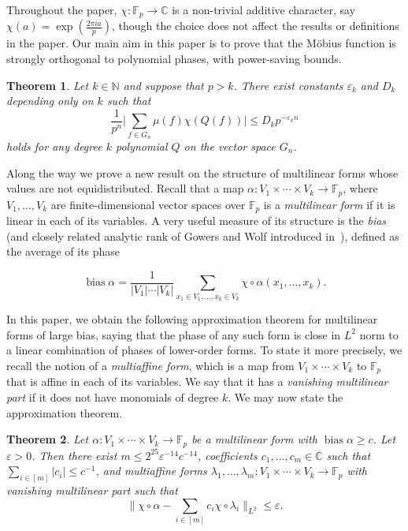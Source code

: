 \documentclass[a4paper,11pt]{article}
\newtheorem{theorem}{Theorem}
\theoremstyle{definition}
\newcommand{\on}[1]{
	\operatorname{#1}
}
\newcommand{\tdt}{\times\cdots\times}
\begin{document}
Throughout the paper, $\chi : \mathbb{F}_p \to \mathbb{C}$ is a non-trivial additive character, say $\chi(a) = \exp(\frac{2 \pi i a}{p})$, though the choice does not affect the results or definitions in the paper. Our main aim in this paper is to prove that the M\"obius function is strongly orthogonal to polynomial phases, with power-saving bounds.

\begin{theorem}\label{main_thm}
    Let $k \in \mathbb{N}$ and suppose that $p > k$. There exist
 constants $\varepsilon_k$ and $D_k$ depending only on $k$ such that 
    \[
    \frac{1}{p^n}\Big|\sum_{f \in G_n} \mu(f)\chi(Q(f))\Big| \leq  D_k p^{-\varepsilon_k n}
    \]
    holds for any degree $k$ polynomial $Q$ on the vector space $G_n$.
\end{theorem}

Along the way we prove a new result on the structure of multilinear forms whose values are not equidistributed. Recall that a map $\alpha : V_1 \tdt V_k \to \mathbb{F}_p$, where $V_1, \dots, V_k$ are finite-dimensional vector spaces over $\mathbb{F}_p$ is a \textit{multilinear form} if it is linear in each of its variables. A very useful measure of its structure is the \textit{bias} (and closely related analytic rank of Gowers and Wolf introduced in~\cite{GowWolf}), defined as the average of its phase 

\[\on{bias}\alpha = \frac{1}{|V_1|\cdots |V_k|} \sum_{x_1 \in V_1, \dots, x_k \in V_k} \chi \circ \alpha(x_1, \dots, x_k).\]

In this paper, we obtain the following approximation theorem for multilinear forms of large bias, saying that the phase of any such form is close in $L^2$ norm to a linear combination of phases of lower-order forms. To state it more precisely, we recall the notion of a \textit{multiaffine form}, which is a map from $V_1 \tdt V_k $ to $\mathbb{F}_p$ that is affine in each of its variables. We say that it has a \textit{vanishing multilinear part} if it does not have monomials of degree $k$. We may now state the approximation theorem.

\begin{theorem}\label{biased_ml_form_approx-intro}
    Let $\alpha : V_1 \tdt V_k \to \mathbb{F}_p$ be a multilinear form with $\on{bias}\alpha \geq c$. Let $\varepsilon > 0$. Then there exist
    $m \leq 2^{25}\varepsilon^{-14}c^{-14}$, coefficients $c_1, \dots, c_m \in \mathbb{C}$ such that $\sum_{i \in [m]} |c_i| \leq c^{-1}$, and multiaffine forms $\lambda_1, \dots, \lambda_m : V_1 \tdt V_k \to \mathbb{F}_p$ with vanishing multilinear part such that 
    \[\Big\| \chi \circ \alpha - \sum_{i \in [m]} c_i \chi \circ \lambda_i\Big\|_{L^2} \leq \varepsilon.\]
\end{theorem}
\end{document}
